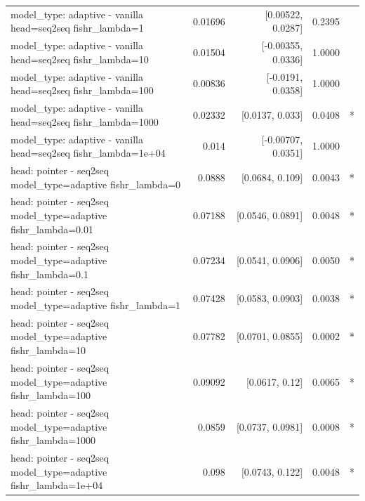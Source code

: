 \documentclass[10pt]{article}
\makeatletter
\newcommand{\stackcell}[1]{\begin{tabular}[t]{@{}l@{}}#1\end{tabular}}
\makeatother
\begin{document}
{\begin{longtable}{lrrrl}
\stackcell{model\_type: adaptive - vanilla\\\footnotesize head=seq2seq fishr\_lambda=1 } & 0.01696 & [0.00522, 0.0287] & 0.2395 & \\
\stackcell{model\_type: adaptive - vanilla\\\footnotesize head=seq2seq fishr\_lambda=10 } & 0.01504 & [-0.00355, 0.0336] & 1.0000 & \\
\stackcell{model\_type: adaptive - vanilla\\\footnotesize head=seq2seq fishr\_lambda=100 } & 0.00836 & [-0.0191, 0.0358] & 1.0000 & \\
\stackcell{model\_type: adaptive - vanilla\\\footnotesize head=seq2seq fishr\_lambda=1000 } & 0.02332 & [0.0137, 0.033] & 0.0408 & *\\
\stackcell{model\_type: adaptive - vanilla\\\footnotesize head=seq2seq fishr\_lambda=1e+04 } & 0.014 & [-0.00707, 0.0351] & 1.0000 & \\
\stackcell{head: pointer - seq2seq\\\footnotesize model\_type=adaptive fishr\_lambda=0 } & 0.0888 & [0.0684, 0.109] & 0.0043 & *\\
\stackcell{head: pointer - seq2seq\\\footnotesize model\_type=adaptive fishr\_lambda=0.01 } & 0.07188 & [0.0546, 0.0891] & 0.0048 & *\\
\stackcell{head: pointer - seq2seq\\\footnotesize model\_type=adaptive fishr\_lambda=0.1 } & 0.07234 & [0.0541, 0.0906] & 0.0050 & *\\
\stackcell{head: pointer - seq2seq\\\footnotesize model\_type=adaptive fishr\_lambda=1 } & 0.07428 & [0.0583, 0.0903] & 0.0038 & *\\
\stackcell{head: pointer - seq2seq\\\footnotesize model\_type=adaptive fishr\_lambda=10 } & 0.07782 & [0.0701, 0.0855] & 0.0002 & *\\
\stackcell{head: pointer - seq2seq\\\footnotesize model\_type=adaptive fishr\_lambda=100 } & 0.09092 & [0.0617, 0.12] & 0.0065 & *\\
\stackcell{head: pointer - seq2seq\\\footnotesize model\_type=adaptive fishr\_lambda=1000 } & 0.0859 & [0.0737, 0.0981] & 0.0008 & *\\
\stackcell{head: pointer - seq2seq\\\footnotesize model\_type=adaptive fishr\_lambda=1e+04 } & 0.098 & [0.0743, 0.122] & 0.0048 & *\\

\end{longtable}}
\end{document}
